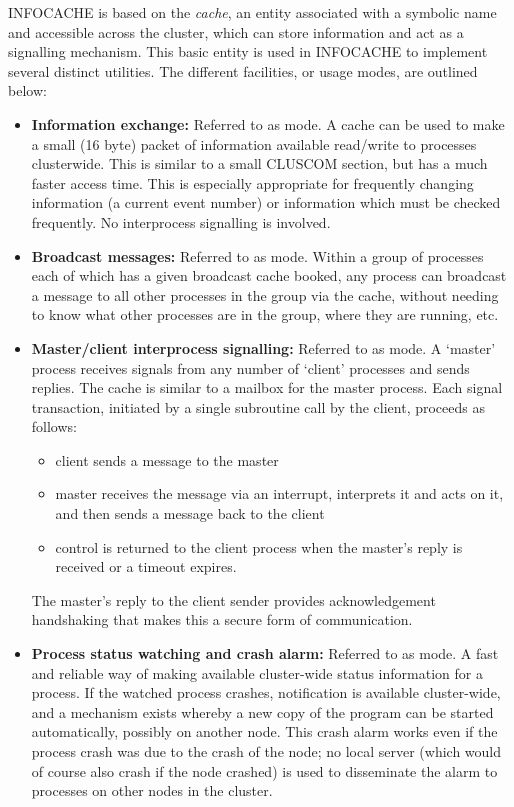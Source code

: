 INFOCACHE is based on the {\sl cache\/},
an entity associated with a symbolic
name and accessible across the cluster, which can store information and
act as a signalling mechanism.
This basic entity is used in INFOCACHE to implement several
distinct utilities.
The different facilities, or usage modes, are outlined below:

\begin{itemize}
\item{\bf Information exchange: }
Referred to as \info mode.
A cache can be used to make a small (16 byte) packet of information
available read/write to processes clusterwide. This is similar to a
small CLUSCOM section, but has a much faster access time.
This is especially
appropriate for frequently changing information (\eg a current event number)
or information which must be checked frequently.
No interprocess signalling is involved.

\item{\bf Broadcast messages: }
    Referred to as \broadcast mode.
    Within a group of processes each of which has a given broadcast
    cache booked, any process can broadcast a message to
    all other processes in the group via the cache, without
    needing to know what other processes are in the group, where they
    are running, etc.

\item{\bf Master/client interprocess signalling: }
    Referred to as \mailbox mode.
    A `master' process receives signals from any number of `client'
    processes and sends replies.
    The cache is similar to a mailbox for the master process.
    Each signal transaction, initiated
    by a single subroutine call by the client, proceeds as follows:
     \begin{itemize}
     \item
       client sends a message to the master
     \item
       master receives the message via an interrupt,
       interprets it and acts on it, and
       then sends a message back to the client
     \item
       control is returned to the client process when the master's reply
       is received or a timeout expires.
     \end{itemize}
    The master's reply to the client sender provides acknowledgement
    handshaking that makes this a secure form of communication.
       
\item{\bf Process status watching and crash alarm: }
    Referred to as \watcher mode.
    A fast and reliable way of making available cluster-wide status
    information for a process. If the watched
    process crashes, notification is
    available cluster-wide, and a mechanism exists whereby a new copy of
    the program can be started automatically, possibly on another node.
    This crash alarm works even
    if the process crash was due to the crash of the node; no local server
    (which would of course also crash if the node crashed)
    is used to disseminate the alarm
    to processes on other nodes in the cluster.


\end{itemize}
